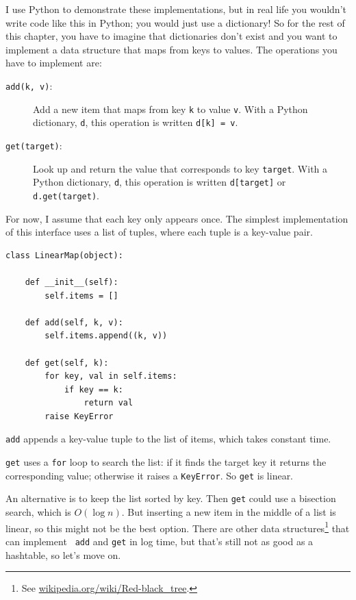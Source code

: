 \documentclass[10pt]{book}
\begin{document}
I use Python to demonstrate these implementations, but in real
life you wouldn't write code like this in Python; you would just use a
dictionary!  So for the rest of this chapter, you have to imagine that
dictionaries don't exist and you want to implement a data structure
that maps from keys to values.  The operations you have to
implement are:

\begin{description}

\item[{\tt add(k, v)}:] Add a new item that maps from key {\tt k}
to value {\tt v}.  With a Python dictionary, {\tt d}, this operation
is written {\tt d[k] = v}.

\item[{\tt get(target)}:] Look up and return the value that corresponds
to key {\tt target}.  With a Python dictionary, {\tt d}, this operation
is written {\tt d[target]} or {\tt d.get(target)}.

\end{description}

For now, I assume that each key only appears once.
The simplest implementation of this interface uses a list of
tuples, where each tuple is a key-value pair.

\begin{verbatim}
class LinearMap(object):

    def __init__(self):
        self.items = []

    def add(self, k, v):
        self.items.append((k, v))

    def get(self, k):
        for key, val in self.items:
            if key == k:
                return val
        raise KeyError
\end{verbatim}

{\tt add} appends a key-value tuple to the list of items, which
takes constant time.

{\tt get} uses a {\tt for} loop to search the list:
if it finds the target key it returns the corresponding value;
otherwise it raises a {\tt KeyError}.
So {\tt get} is linear.

An alternative is to keep the list sorted by key.  Then {\tt get}
could use a bisection search, which is $O(\log n)$.  But inserting a
new item in the middle of a list is linear, so this might not be the
best option.  There are other data structures\footnote{See
  \url{wikipedia.org/wiki/Red-black_tree}.}  that can implement {\tt
  add} and {\tt get} in log time, but that's still not as good as a
hashtable, so let's move on.
\end{document}
